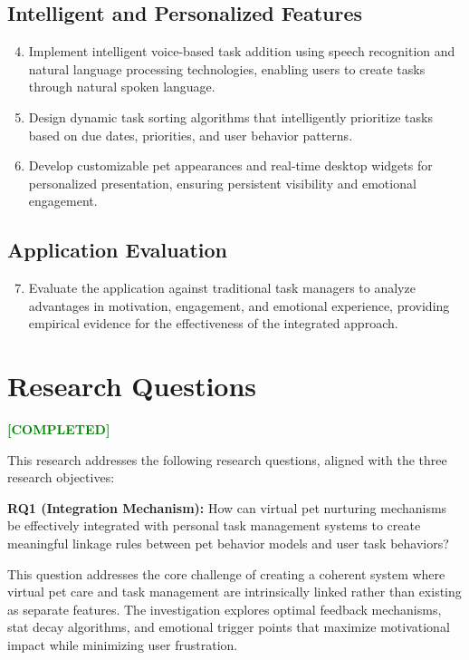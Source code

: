 \documentclass[12pt,a4paper]{report}
\newcommand{\completed}{\textcolor{green}{\textbf{[COMPLETED]}}}
\begin{document}
\subsection{Intelligent and Personalized Features}

\begin{enumerate}
    \setcounter{enumi}{3}
    \item Implement intelligent voice-based task addition using speech recognition and natural language processing technologies, enabling users to create tasks through natural spoken language.
    
    \item Design dynamic task sorting algorithms that intelligently prioritize tasks based on due dates, priorities, and user behavior patterns.
    
    \item Develop customizable pet appearances and real-time desktop widgets for personalized presentation, ensuring persistent visibility and emotional engagement.
\end{enumerate}

\subsection{Application Evaluation}

\begin{enumerate}
    \setcounter{enumi}{6}
    \item Evaluate the application against traditional task managers to analyze advantages in motivation, engagement, and emotional experience, providing empirical evidence for the effectiveness of the integrated approach.
\end{enumerate}

\section{Research Questions}
\label{sec:research-questions}

\completed

This research addresses the following research questions, aligned with the three research objectives:

\textbf{RQ1 (Integration Mechanism):} How can virtual pet nurturing mechanisms be effectively integrated with personal task management systems to create meaningful linkage rules between pet behavior models and user task behaviors?

This question addresses the core challenge of creating a coherent system where virtual pet care and task management are intrinsically linked rather than existing as separate features. The investigation explores optimal feedback mechanisms, stat decay algorithms, and emotional trigger points that maximize motivational impact while minimizing user frustration.
\end{document}
